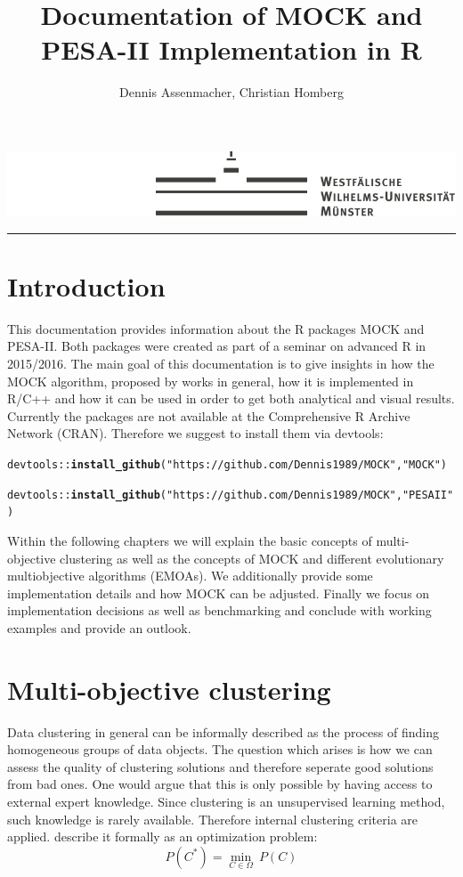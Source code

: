 \documentclass[parskip=half,DIV=14]{scrartcl}\usepackage[]{graphicx}\usepackage[]{color}
\title{Documentation of MOCK and PESA-II Implementation in R}
\author{Dennis Assenmacher, Christian Homberg}
\makeatletter
\newcommand{\hlstr}[1]{\textcolor[rgb]{0.192,0.494,0.8}{#1}}%
\newcommand{\hlopt}[1]{\textcolor[rgb]{0,0,0}{#1}}%
\newcommand{\hlstd}[1]{\textcolor[rgb]{0.345,0.345,0.345}{#1}}%
\newcommand{\hlkwd}[1]{\textcolor[rgb]{0.737,0.353,0.396}{\textbf{#1}}}%
\newenvironment{kframe}{%
 \def\at@end@of@kframe{}%
 \ifinner\ifhmode%
  \def\at@end@of@kframe{\end{minipage}}%
  \begin{minipage}{\columnwidth}%
 \fi\fi%
 \def\FrameCommand##1{\hskip\@totalleftmargin \hskip-\fboxsep
 \colorbox{shadecolor}{##1}\hskip-\fboxsep
     \hskip-\linewidth \hskip-\@totalleftmargin \hskip\columnwidth}%
 \MakeFramed {\advance\hsize-\width
   \@totalleftmargin\z@ \linewidth\hsize
   \@setminipage}}%
 {\par\unskip\endMakeFramed%
 \at@end@of@kframe}
\newenvironment{knitrout}{}{} %
\renewcommand{\maketitle}{
   \clearscrheadfoot
   \cfoot{\pagemark}
   \begin{titlepage}
   
   \thispagestyle{scrheadings}
   \begin{center}
   \vspace*{-2cm}
   \includegraphics{wwu}
   \vspace{8pt}
   \hrule
   \vspace{15pt}
       {\Huge \@title}
 
   \vspace{\parskip}
 
   {\Large \@author}
 
   \@date
   \end{center}
   \end{titlepage}
}
\makeatother
\begin{document}
\maketitle

\section{Introduction}
This documentation provides information about the R packages MOCK and PESA-II. Both packages were created as part of a seminar on advanced R in 2015/2016. The main goal of this documentation is to give insights in how the MOCK algorithm, proposed by \textcite{handl} works in general, how it is implemented in R/C++ and how it can be used in order to get both analytical and visual results. Currently the packages are not available at the Comprehensive R Archive Network (CRAN). Therefore we suggest to install them via devtools:
\begin{knitrout}
\color{fgcolor}\begin{kframe}
\begin{alltt}
\hlstd{devtools}\hlopt{::}\hlkwd{install_github}\hlstd{(}\hlstr{"https://github.com/Dennis1989/MOCK"}\hlstd{,}\hlstr{"MOCK"}\hlstd{)}

\hlstd{devtools}\hlopt{::}\hlkwd{install_github}\hlstd{(}\hlstr{"https://github.com/Dennis1989/MOCK"}\hlstd{,}\hlstr{"PESAII"}\hlstd{)}
\end{alltt}
\end{kframe}
\end{knitrout}

Within the following chapters we will explain the basic concepts of multi-objective clustering as well as the concepts of MOCK and different evolutionary multiobjective algorithms (EMOAs). We additionally provide some implementation details and how MOCK can be adjusted. Finally we focus on implementation decisions as well as benchmarking and conclude with working examples and provide an outlook.
\section{Multi-objective clustering}
Data clustering in general can be informally described as the process of finding homogeneous groups of data objects. The question which arises is how we can assess the quality of clustering solutions and therefore seperate good solutions from bad ones. One would argue that this is only possible by having access to external expert knowledge. Since clustering is an unsupervised learning method, such knowledge is rarely available. Therefore internal clustering criteria are applied. \textcite{handl2007} describe it formally as an optimization problem: 
\begin{displaymath}
P(C^*) = \underset{C\in\Omega}{\min}\ P(C)
\end{displaymath}
\end{document}

